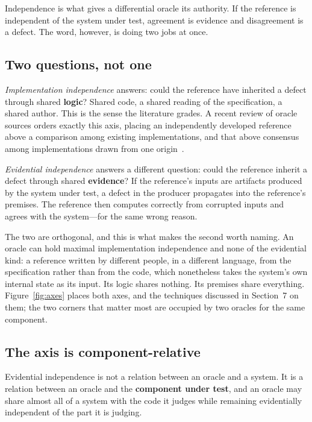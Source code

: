 Independence is what gives a differential oracle its authority. If the reference is
independent of the system under test, agreement is evidence and disagreement is a
defect. The word, however, is doing two jobs at once.

\subsection{Two questions, not one}

\emph{Implementation independence} answers: could the reference have inherited a
defect through shared \textbf{logic}? Shared code, a shared reading of the
specification, a shared author. This is the sense the literature grades. A recent
review of oracle sources orders exactly this axis, placing an independently
developed reference above a comparison among existing implementations, and that
above consensus among implementations drawn from one origin~\cite{oraclesurvey2026}.

\emph{Evidential independence} answers a different question: could the reference
inherit a defect through shared \textbf{evidence}? If the reference's inputs are
artifacts produced by the system under test, a defect in the producer propagates
into the reference's premises. The reference then computes correctly from corrupted
inputs and agrees with the system---for the same wrong reason.

The two are orthogonal, and this is what makes the second worth naming. An oracle
can hold maximal implementation independence and none of the evidential kind: a
reference written by different people, in a different language, from the
specification rather than from the code, which nonetheless takes the system's own
internal state as its input. Its logic shares nothing. Its premises share
everything. Figure~\ref{fig:axes} places both axes, and the techniques discussed in
Section~7 on them; the two corners that matter most are occupied by two oracles for
the same component.



\subsection{The axis is component-relative}

Evidential independence is not a relation between an oracle and a system. It is a
relation between an oracle and the \textbf{component under test}, and an oracle may
share almost all of a system with the code it judges while remaining evidentially
independent of the part it is judging.

